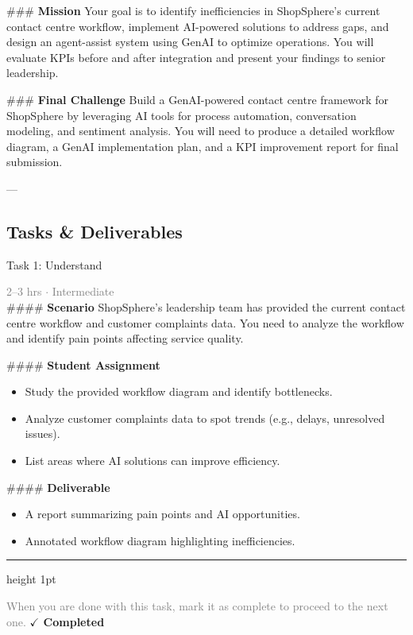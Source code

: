 \documentclass[10pt,a4paper]{article}
\begin{document}
\#\#\# \textbf{Mission}  
Your goal is to identify inefficiencies in ShopSphere’s current contact centre workflow, implement AI-powered solutions to address gaps, and design an agent-assist system using GenAI to optimize operations. You will evaluate KPIs before and after integration and present your findings to senior leadership.  

\#\#\# \textbf{Final Challenge}  
Build a GenAI-powered contact centre framework for ShopSphere by leveraging AI tools for process automation, conversation modeling, and sentiment analysis. You will need to produce a detailed workflow diagram, a GenAI implementation plan, and a KPI improvement report for final submission.

---

\subsection*{Tasks \& Deliverables}

\begin{taskbox}{Task 1: Understand}

    {\small \textcolor{gray}{2--3 hrs $\cdot$ Intermediate}}\\[12pt]

    \#\#\#\# \textbf{Scenario}  
ShopSphere’s leadership team has provided the current contact centre workflow and customer complaints data. You need to analyze the workflow and identify pain points affecting service quality.  

\#\#\#\# \textbf{Student Assignment}  
\begin{itemize}
    \item Study the provided workflow diagram and identify bottlenecks.  
    \item Analyze customer complaints data to spot trends (e.g., delays, unresolved issues).  
    \item List areas where AI solutions can improve efficiency.  
\end{itemize}

\#\#\#\# \textbf{Deliverable}  
\begin{itemize}
    \item A report summarizing pain points and AI opportunities.  
    \item Annotated workflow diagram highlighting inefficiencies.\par
\end{itemize}

    \vspace{16pt}

    \textcolor{cardBorder}{\hrule height 1pt}\vspace{8pt}

    \small \textcolor{gray}{When you are done with this task, mark it as complete to proceed to the next one.} \hfill \textbf{\textcolor{brandDark}{$\checkmark$ Completed}}

\end{taskbox}
\end{document}
